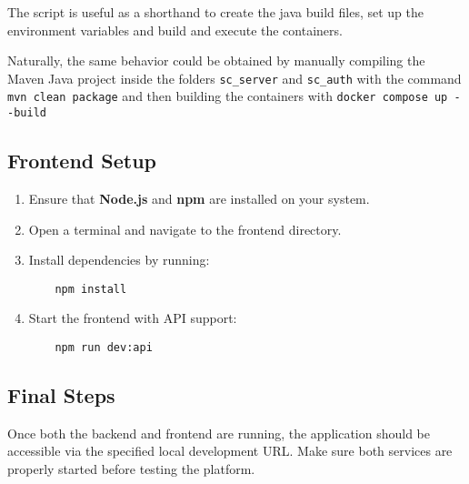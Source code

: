 The script is useful as a shorthand to create the java build files, set up the environment variables and build and execute the containers.

Naturally, the same behavior could be obtained by manually compiling the Maven Java project inside the folders \verb|sc_server| and \verb|sc_auth| with the command \verb|mvn clean package| and then building the containers with \verb|docker compose up --build|



\subsection{Frontend Setup}

\begin{enumerate}
    \item Ensure that \textbf{Node.js} and \textbf{npm} are installed on your system.
    \item Open a terminal and navigate to the frontend directory.
    \item Install dependencies by running:

    \begin{verbatim}
    npm install
    \end{verbatim}

    \item Start the frontend with API support:

    \begin{verbatim}
    npm run dev:api
    \end{verbatim}

\end{enumerate}

\subsection{Final Steps}

Once both the backend and frontend are running, the application should be accessible via the specified local development URL. Make sure both services are properly started before testing the platform.

